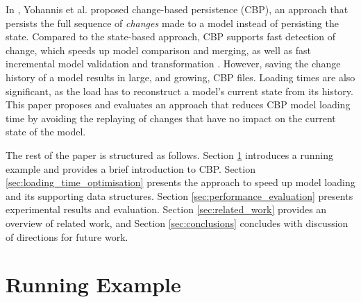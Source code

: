 \documentclass{llncs}
\begin{document}
    In \cite{yohannis2017turning}, Yohannis et al. proposed change-based persistence (CBP), an approach that persists the full sequence of \emph{changes} made to a model instead of persisting the state.  Compared to the state-based approach, CBP supports fast detection of change, which speeds up model comparison and merging, as well as fast incremental model validation and transformation \cite{rath2012derived,ogunyomi2015property}.
    However, saving the change history of a model results in large, and growing, CBP files.  Loading times are also significant, as the load has to reconstruct a model's current state from its history\cite{yohannis2017turning}.   This paper proposes and evaluates an approach that reduces CBP model loading time by avoiding the replaying of changes that have no impact on the current state of the model.
    
    The rest of the paper is structured as follows. Section \ref{sec:case_study} introduces a running example and provides a brief introduction to CBP.
    Section \ref{sec:loading_time_optimisation} presents the approach to speed up model loading and its supporting data structures. Section \ref{sec:performance_evaluation} presents experimental results and evaluation. Section \ref{sec:related_work} provides an overview of related work, and Section \ref{sec:conclusions} concludes with discussion of directions for future work.
    
    \section{Running Example}
    \label{sec:case_study}
    
\end{document}
